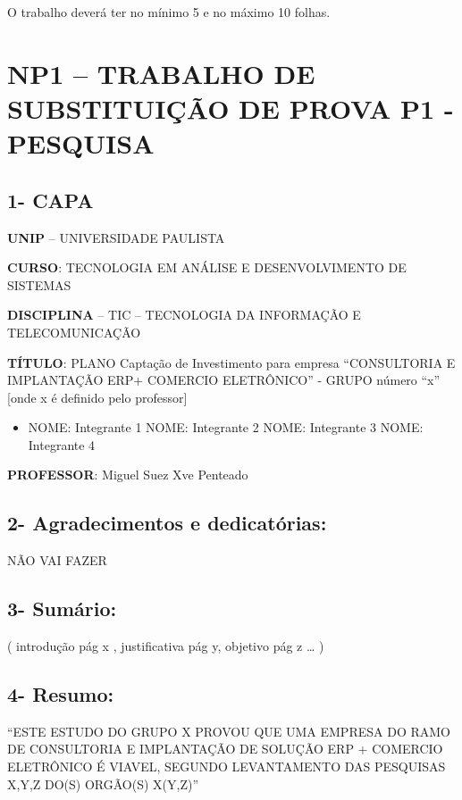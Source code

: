 \documentclass[
]{book}
\providecommand{\tightlist}{%
  \setlength{\itemsep}{0pt}\setlength{\parskip}{0pt}}
\begin{document}
O trabalho deverá ter no mínimo 5 e no máximo 10 folhas.

\section{NP1 -- TRABALHO DE SUBSTITUIÇÃO DE PROVA P1 - PESQUISA}\label{np1-trabalho-de-substituiuxe7uxe3o-de-prova-p1---pesquisa}

\subsection{1- CAPA}\label{capa}

\textbf{UNIP} -- UNIVERSIDADE PAULISTA

\textbf{CURSO}: TECNOLOGIA EM ANÁLISE E DESENVOLVIMENTO DE SISTEMAS

\textbf{DISCIPLINA} -- TIC -- TECNOLOGIA DA INFORMAÇÃO E TELECOMUNICAÇÃO

\textbf{TÍTULO}: PLANO Captação de Investimento para empresa ``CONSULTORIA E IMPLANTAÇÃO ERP+ COMERCIO ELETRÔNICO'' - GRUPO número ``x'' {[}onde x é definido pelo professor{]}

\begin{itemize}
\tightlist
\item
  NOME: Integrante 1 NOME: Integrante 2 NOME: Integrante 3 NOME: Integrante 4
\end{itemize}

\textbf{PROFESSOR}: Miguel Suez Xve Penteado

\subsection{2- Agradecimentos e dedicatórias:}\label{agradecimentos-e-dedicatuxf3rias}

NÃO VAI FAZER

\subsection{3- Sumário:}\label{sumuxe1rio}

( introdução pág x , justificativa pág y, objetivo pág z \ldots{} )

\subsection{4- Resumo:}\label{resumo}

``ESTE ESTUDO DO GRUPO X PROVOU QUE UMA EMPRESA DO RAMO DE CONSULTORIA E IMPLANTAÇÃO DE SOLUÇÃO ERP + COMERCIO ELETRÔNICO É VIAVEL, SEGUNDO LEVANTAMENTO DAS PESQUISAS X,Y,Z DO(S) ORGÃO(S) X(Y,Z)''
\end{document}
